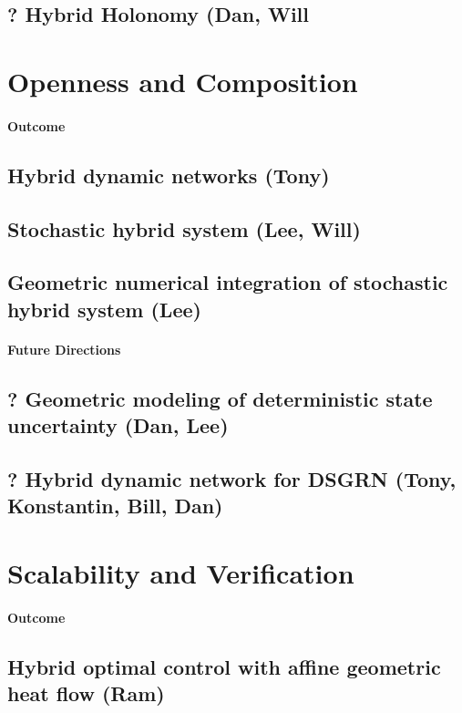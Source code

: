 \documentclass[letterpaper,11pt]{article}
\begin{document}
\subsection{? Hybrid Holonomy (Dan, Will}
\vspace*{0.3cm}

\section{Openness and Composition}
\paragraph*{Outcome}
\subsection{Hybrid dynamic networks (Tony)}
\subsection{Stochastic hybrid system (Lee, Will)}
\subsection{Geometric numerical integration of stochastic hybrid system (Lee)}
\paragraph*{Future Directions}
\subsection{? Geometric modeling of deterministic state uncertainty (Dan, Lee)}
\subsection{? Hybrid dynamic network for DSGRN (Tony, Konstantin, Bill, Dan)}
\vspace*{0.3cm}


\section{Scalability and Verification}
\paragraph*{Outcome}
\subsection{Hybrid optimal control with affine geometric heat flow (Ram)}
\end{document}
